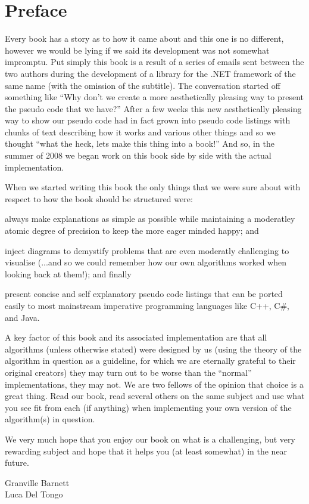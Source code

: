 \chapter*{Preface}
Every book has a story as to how it came about and this one is no different, however we would be lying if we said its development was not somewhat impromptu. Put simply this book is a result of a series of emails sent between the two authors during the development of a library for the .NET framework of the same name (with the omission of the subtitle). The conversation started off something like ``Why don't we create a more aesthetically pleasing way to present the pseudo code that we have?'' After a few weeks this new aesthetically pleasing way to show our pseudo code had in fact grown into pseudo code listings with chunks of text describing how it works and various other things and so we thought ``what the heck, lets make this thing into a book!'' And so, in the summer of 2008 we began work on this book side by side with the actual implementation.

When we started writing this book the only things that we were sure about with respect to how the book should be structured were:
\begin{inparaenum}
\item always make explanations as simple as possible while maintaining a moderatley atomic degree of precision to keep the more eager minded happy; and
\item inject diagrams to demystify problems that are even moderatly challenging to visualise (...and so we could remember how our own algorithms worked when looking back at them!); and finally
\item present concise and self explanatory pseudo code listings that can be ported easily to most mainstream imperative programming languages like C++, C\#, and Java.
\end{inparaenum}

A key factor of this book and its associated implementation are that all algorithms (unless otherwise stated) were designed by us (using the theory of the algorithm in question as a guideline, for which we are eternally grateful to their original creators) they may turn out to be worse than the ``normal'' implementations, they may not. We are two fellows of the opinion that choice is a great thing. Read our book, read several others on the same subject and use what you see fit from each (if anything) when implementing your own version of the algorithm(s) in question.

We very much hope that you enjoy our book on what is a challenging, but very rewarding subject and hope that it helps you (at least somewhat) in the near future.


\begin{center}
Granville Barnett \\
Luca Del Tongo
\end{center}
